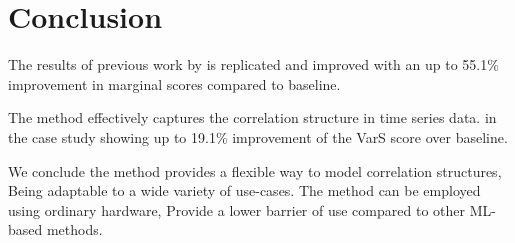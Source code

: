 \section{Conclusion}

The results of previous work by \citet{jorgensenSequentialMethodsError2025} is replicated and improved with an up to 55.1\% improvement in marginal scores compared to baseline.

The method  effectively captures the correlation structure in time series data. in the case study showing up to 19.1\% improvement of the VarS score over baseline.

We conclude the method provides a flexible way to model correlation structures, Being adaptable to a wide variety of use-cases. The method can be employed using ordinary hardware, Provide a lower barrier of use compared to other ML-based methods.
